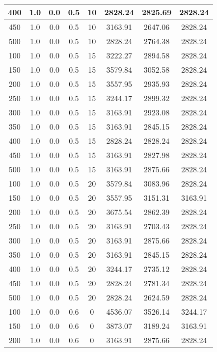 \documentclass[a4paper, 12pt]{extreport}
\begin{document}
\begin{itemize}
\begin{longtable}{|c|c|c|c|c|c|c|c|}
			400 & 1.0 & 0.0 & 0.5 & 10 & 2828.24 & 2825.69 & 2828.24 \\\hline
			450 & 1.0 & 0.0 & 0.5 & 10 & 3163.91 & 2647.06 & 2828.24 \\\hline
			500 & 1.0 & 0.0 & 0.5 & 10 & 2828.24 & 2764.38 & 2828.24 \\\hline
			100 & 1.0 & 0.0 & 0.5 & 15 & 3222.27 & 2894.58 & 2828.24 \\\hline
			150 & 1.0 & 0.0 & 0.5 & 15 & 3579.84 & 3052.58 & 2828.24 \\\hline
			200 & 1.0 & 0.0 & 0.5 & 15 & 3557.95 & 2935.93 & 2828.24 \\\hline
			250 & 1.0 & 0.0 & 0.5 & 15 & 3244.17 & 2899.32 & 2828.24 \\\hline
			300 & 1.0 & 0.0 & 0.5 & 15 & 3163.91 & 2923.08 & 2828.24 \\\hline
			350 & 1.0 & 0.0 & 0.5 & 15 & 3163.91 & 2845.15 & 2828.24 \\\hline
			400 & 1.0 & 0.0 & 0.5 & 15 & 2828.24 & 2828.24 & 2828.24 \\\hline
			450 & 1.0 & 0.0 & 0.5 & 15 & 3163.91 & 2827.98 & 2828.24 \\\hline
			500 & 1.0 & 0.0 & 0.5 & 15 & 3163.91 & 2875.66 & 2828.24 \\\hline
			100 & 1.0 & 0.0 & 0.5 & 20 & 3579.84 & 3083.96 & 2828.24 \\\hline
			150 & 1.0 & 0.0 & 0.5 & 20 & 3557.95 & 3151.31 & 3163.91 \\\hline
			200 & 1.0 & 0.0 & 0.5 & 20 & 3675.54 & 2862.39 & 2828.24 \\\hline
			250 & 1.0 & 0.0 & 0.5 & 20 & 3163.91 & 2703.43 & 2828.24 \\\hline
			300 & 1.0 & 0.0 & 0.5 & 20 & 3163.91 & 2875.66 & 2828.24 \\\hline
			350 & 1.0 & 0.0 & 0.5 & 20 & 3163.91 & 2845.15 & 2828.24 \\\hline
			400 & 1.0 & 0.0 & 0.5 & 20 & 3244.17 & 2735.12 & 2828.24 \\\hline
			450 & 1.0 & 0.0 & 0.5 & 20 & 2828.24 & 2781.34 & 2828.24 \\\hline
			500 & 1.0 & 0.0 & 0.5 & 20 & 2828.24 & 2624.59 & 2828.24 \\\hline
			100 & 1.0 & 0.0 & 0.6 & 0 & 4536.07 & 3526.14 & 3244.17 \\\hline
			150 & 1.0 & 0.0 & 0.6 & 0 & 3873.07 & 3189.24 & 3163.91 \\\hline
			200 & 1.0 & 0.0 & 0.6 & 0 & 3163.91 & 2875.66 & 2828.24 \\\hline

\end{longtable}
\end{itemize}
\end{document}
